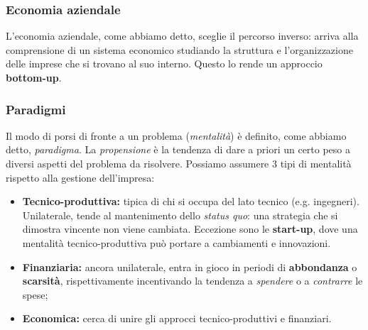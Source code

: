 \documentclass[a4paper,11pt]{article}
\begin{document}
\subsubsection{Economia aziendale}
L'economia aziendale, come abbiamo detto, sceglie il percorso inverso: arriva alla comprensione di un sistema economico studiando la struttura e l'organizzazione delle imprese che si trovano al suo interno.
Questo lo rende un approccio \textbf{bottom-up}.

\subsubsection{Paradigmi}
Il modo di porsi di fronte a un problema (\textit{mentalità}) è definito, come abbiamo detto, \textit{paradigma}.
La \textit{propensione} è la tendenza di dare a priori un certo peso a diversi aspetti del problema da risolvere.
Possiamo assumere 3 tipi di mentalità rispetto alla gestione dell'impresa:
\begin{itemize}
	\item \textbf{Tecnico-produttiva:} tipica di chi si occupa del lato tecnico (e.g. ingegneri). 
		Unilaterale, tende al mantenimento dello \textit{status quo}: una strategia che si dimostra vincente non viene cambiata. Eccezione sono le \textbf{start-up}, dove una mentalità tecnico-produttiva può portare a cambiamenti e innovazioni.
	\item \textbf{Finanziaria:} ancora unilaterale, entra in gioco in periodi di \textbf{abbondanza} o \textbf{scarsità}, rispettivamente incentivando la tendenza a \textit{spendere} o a \textit{contrarre} le spese;
	\item \textbf{Economica:} cerca di unire gli approcci tecnico-produttivi e finanziari.
\end{itemize}
\end{document}
